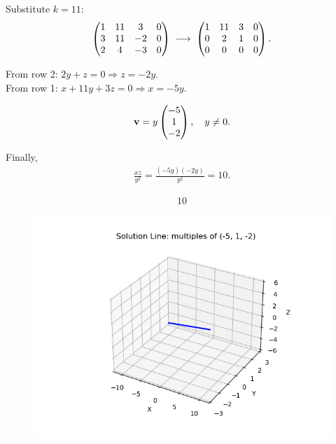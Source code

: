 \documentclass[12pt]{article}
\begin{document}
Substitute $k=11$:
\begin{align}
\begin{pmatrix}1 & 11 & 3 & 0 \\ 3 & 11 & -2 & 0 \\ 2 & 4 & -3 & 0\end{pmatrix}
\;\longrightarrow\;
\begin{pmatrix}1 & 11 & 3 & 0 \\ 0 & 2 & 1 & 0 \\ 0 & 0 & 0 & 0\end{pmatrix}.
\end{align}

From row 2: $2y+z=0 \Rightarrow z=-2y$.  \\
From row 1: $x+11y+3z=0 \Rightarrow x=-5y$.

\begin{align}
\mathbf{v} = y\begin{pmatrix}-5\\1\\-2\end{pmatrix}, \quad y\neq 0.
\end{align}

Finally,
\begin{align}
\frac{xz}{y^2} = \frac{(-5y)(-2y)}{y^2} = 10.
\end{align}

\begin{align}
\boxed{10}
\end{align}

\begin{figure}[H]
    \centering
    \includegraphics[width=0.9\columnwidth]{figs/solvek.png}
    \caption{}
    \label{fig:placeholder}
\end{figure}
\end{document}
